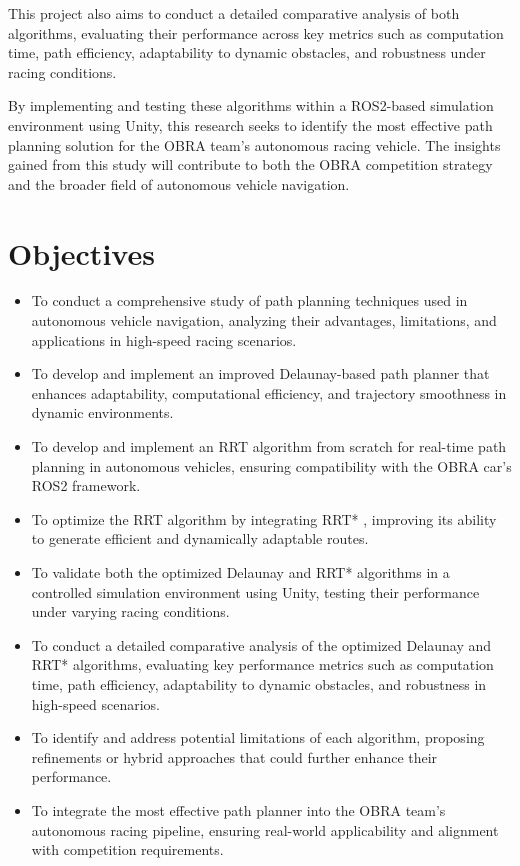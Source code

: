 \documentclass[a4paper,12pt]{report}
\begin{document}
This project also aims to conduct a detailed comparative analysis of both algorithms, evaluating their performance across key metrics such as computation time, path efficiency, adaptability to dynamic obstacles, and robustness under racing conditions. 

By implementing and testing these algorithms within a ROS2-based simulation environment using Unity, this research seeks to identify the most effective path planning solution for the OBRA team's autonomous racing vehicle. The insights gained from this study will contribute to both the OBRA competition strategy and the broader field of autonomous vehicle navigation.


\section{Objectives}
\begin{itemize}
    \item To conduct a comprehensive study of path planning techniques used in autonomous vehicle navigation, analyzing their advantages, limitations, and applications in high-speed racing scenarios. \cite{reference3}
    \item To develop and implement an improved Delaunay-based path planner that enhances adaptability, computational efficiency, and trajectory smoothness in dynamic environments.
    \item To develop and implement an RRT algorithm from scratch for real-time path planning in autonomous vehicles, ensuring compatibility with the OBRA car's ROS2 framework.
    \item To optimize the RRT algorithm by integrating RRT* \cite{reference4}, improving its ability to generate efficient and dynamically adaptable routes.
    \item To validate both the optimized Delaunay and RRT* algorithms in a controlled simulation environment using Unity, testing their performance under varying racing conditions.
    \item To conduct a detailed comparative analysis of the optimized Delaunay and RRT* algorithms, evaluating key performance metrics such as computation time, path efficiency, adaptability to dynamic obstacles, and robustness in high-speed scenarios.
    \item To identify and address potential limitations of each algorithm, proposing refinements or hybrid approaches that could further enhance their performance.
    \item To integrate the most effective path planner into the OBRA team's autonomous racing pipeline, ensuring real-world applicability and alignment with competition requirements.
\end{itemize}
\end{document}
